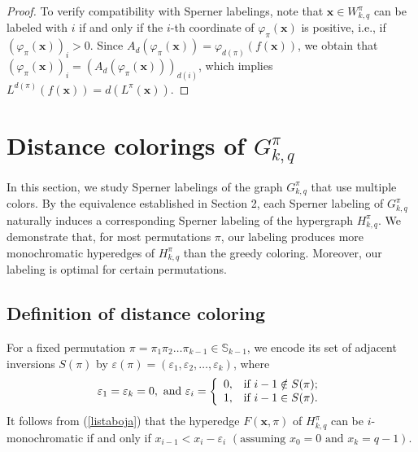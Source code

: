 \documentclass{birkjour}
\theoremstyle{definition}
\theoremstyle{remark}
\numberwithin{equation}{section}
\begin{document}
\begin{proof}
To verify compatibility with Sperner labelings, note that
$\mathbf{x} \in W_{k,q}^\pi$ can be labeled with $i$ if and only
if the $i$-th coordinate of $\varphi_\pi(\mathbf{x})$ is positive,
i.e., if $(\varphi_\pi(\mathbf{x}))_i>0$. Since
$A_d(\varphi_\pi(\mathbf{x})) = \varphi_{d(\pi)}(f(\mathbf{x}))$,
we obtain that
$(\varphi_\pi(\mathbf{x}))_i=(A_d(\varphi_\pi(\mathbf{x})))_{d(i)}$,
which implies $L^{d(\pi)}(f(\mathbf{x}))=d(L^\pi(\mathbf{x}))$.

\end{proof}


\section{Distance colorings of $G^\pi_{k,q}$}
In this section, we study Sperner labelings of the graph
$G^\pi_{k,q}$ that use multiple colors. By the equivalence
established in Section 2, each Sperner labeling of $G^\pi_{k,q}$
naturally induces a corresponding Sperner labeling of the
hypergraph $H^\pi_{k,q}$. We demonstrate that, for most
permutations $\pi$, our labeling produces more monochromatic
hyperedges of $H^\pi_{k,q}$ than the greedy coloring. Moreover,
our labeling is optimal for certain permutations.
\subsection{Definition of distance coloring}
For a fixed permutation $\pi=\pi_1 \pi_2\ldots\pi_{k-1}\in
\mathbb{S}_{k-1}$, we encode its set of adjacent inversions
$S(\pi)$ by
 $\varepsilon(\pi)=(\varepsilon_1,\varepsilon_2,\ldots,\varepsilon_{k})$,
 where
 $$\varepsilon_1=\varepsilon_k=0,\textrm{ and }\varepsilon_i=\left\{%
\begin{array}{ll}
    0, & \hbox{if $i-1 \notin S(\pi)$;} \\
   1, & \hbox{if $i-1 \in S(\pi)$.} \\
\end{array}%
\right    .$$ It follows from (\ref{listaboja}) that the hyperedge
$F(\mathbf{x},\pi)$ of $H^\pi_{k,q}$ can be $i$-monochromatic if
and only if $x_{i-1}<x_i-\varepsilon_{i} \,\,(\textrm{assuming }
x_{0}=0 \textrm{ and }x_k=q-1)$.
\end{document}
